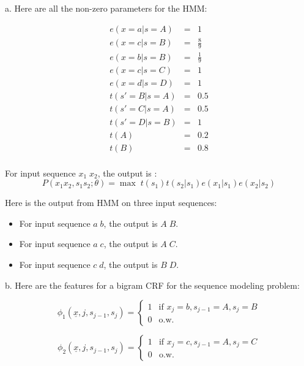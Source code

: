 \documentclass[12pt]{article}
\begin{document}
a. Here are all the non-zero parameters for the HMM:

\begin{eqnarray*}
e(x  = a | s = A) &=& 1 \\
e(x  = c | s = B) &=& \frac {8}{9} \\
e(x  = b | s = B) &=& \frac {1}{9} \\
e(x  = c | s = C) &=& 1 \\
e(x  = d | s = D) &=& 1 \\
t(s' = B | s = A) &=& 0.5 \\
t(s' = C | s = A) &=& 0.5 \\
t(s' = D | s = B) &=& 1 \\
t(A) &=& 0.2 \\
t(B) &=& 0.8 \\
\end{eqnarray*}

For input sequence $x_1 \; x_2$, the output is :
\begin{equation*}
P(x_1x_2, s_1s_2; \theta) = \max \; {t(s_1)t(s_2|s_1)e(x_1|s_1)e(x_2|s_2)}
\end{equation*}

Here is the output from HMM on three input sequences:
\begin{itemize}
\item For input sequence $a \; b$, the output is $A \; B$.
\item For input sequence $a \; c$, the output is $A \; C$.
\item For input sequence $c \; d$, the output is $B \; D$.
\end{itemize}

b. Here are the features for a bigram CRF for the sequence modeling
problem:

\begin{equation*}
\phi_1(\underline {x}, j, s_{j-1}, s_j) =
  \begin{cases}
    1 & \text{if } x_j = b, s_{j-1} = A, s_j = B \\
    0 & \text{o.w.}
  \end{cases}
\end{equation*}

\begin{equation*}
\phi_2(\underline {x}, j, s_{j-1}, s_j) =
  \begin{cases}
    1 & \text{if } x_j = c, s_{j-1} = A, s_j = C \\
    0 & \text{o.w.}
  \end{cases}
\end{equation*}
\end{document}
